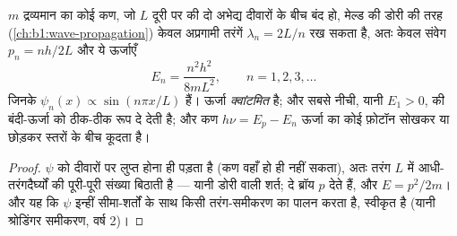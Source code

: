 \begin{proposition}[डिब्बे में कण]\label{prop:b1:quantum-introduction:box}
$m$ द्रव्यमान का कोई कण, जो $L$ दूरी पर की दो अभेद्य दीवारों के बीच बंद हो,
मेल्ड की डोरी की तरह (\cref{ch:b1:wave-propagation}) केवल अप्रगामी तरंगें
$\lambda_n = 2L/n$ रख सकता है, अतः केवल संवेग $p_n = nh/2L$ और ये ऊर्जाएँ
\[
E_n = \frac{n^2h^2}{8mL^2} , \qquad n = 1, 2, 3, \ldots
\]
जिनके  $\psi_n(x) \propto \sin(n\pi x/L)$ हैं। ऊर्जा
\emph{क्वांटमित} है; और सबसे नीची, यानी \emph{} $E_1 > 0$,
 की बंदी-ऊर्जा को ठीक-ठीक रूप दे देती है; और कण
$h\nu = E_p - E_n$ ऊर्जा का कोई फ़ोटॉन सोखकर या छोड़कर स्तरों के बीच कूदता
है।
\end{proposition}

\begin{proof}
$\psi$ को दीवारों पर लुप्त होना ही पड़ता है (कण वहाँ हो ही नहीं सकता), अतः
तरंग $L$ में आधी-तरंगदैर्घ्यों की पूरी-पूरी संख्या बिठाती है --- यानी डोरी
वाली शर्त; दे ब्रॉय $p$ देते हैं, और $E = p^2/2m$। और यह कि $\psi$ इन्हीं
सीमा-शर्तों के साथ किसी तरंग-समीकरण का पालन करता है, स्वीकृत है (यानी
श्रोडिंगर समीकरण, वर्ष 2)।
\end{proof}

